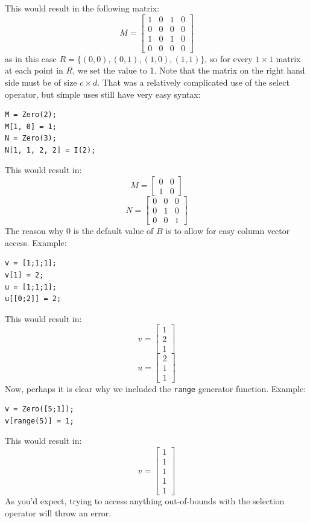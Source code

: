 This would result in the following matrix:
$$M = \begin{bmatrix}
1 & 0 & 1 & 0\\
0 & 0 & 0 & 0\\
1 & 0 & 1 & 0\\
0 & 0 & 0 & 0
\end{bmatrix}$$
as in this case $R=\{(0,0), (0,1), (1,0), (1,1)\}$, so for every $1\times 1$ matrix at each point in $R$, we set the value to 1.  Note that the matrix on the right hand side must be of size $c\times d$.  That was a relatively complicated use of the select operator, but simple uses still have very easy syntax:
\begin{lstlisting}
M = Zero(2);
M[1, 0] = 1;
N = Zero(3);
N[1, 1, 2, 2] = I(2);
\end{lstlisting}
This would result in:
$$M=\begin{bmatrix}0 & 0 \\ 1 & 0\end{bmatrix}$$
$$N=\begin{bmatrix}
0 & 0 & 0\\
0 & 1 & 0\\
0 & 0 & 1\end{bmatrix}$$
The reason why 0 is the default value of $B$ is to allow for easy column vector access.  Example:
\begin{lstlisting}
v = [1;1;1];
v[1] = 2;
u = [1;1;1];
u[[0;2]] = 2;
\end{lstlisting}
This would result in:
$$v=\begin{bmatrix}1\\2\\1\end{bmatrix}$$
$$u=\begin{bmatrix}2\\1\\1\end{bmatrix}$$
Now, perhaps it is clear why we included the \verb=range= generator function.  Example:
\begin{lstlisting}
v = Zero([5;1]);
v[range(5)] = 1;
\end{lstlisting}
This would result in:
$$v=\begin{bmatrix}1\\1\\1\\1\\1\end{bmatrix}$$
As you'd expect, trying to access anything out-of-bounds with the selection operator will throw an error.

